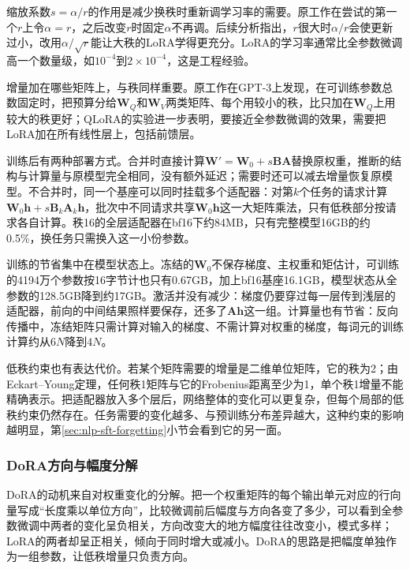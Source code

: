 缩放系数$s=\alpha/r$的作用是减少换秩时重新调学习率的需要。原工作在尝试的第一个$r$上令$\alpha=r$，之后改变$r$时固定$\alpha$不再调。后续分析指出，$r$很大时$\alpha/r$会使更新过小，改用$\alpha/\sqrt r$能让大秩的LoRA学得更充分。LoRA的学习率通常比全参数微调高一个数量级，如$10^{-4}$到$2\times10^{-4}$，这是工程经验。

增量加在哪些矩阵上，与秩同样重要。原工作在GPT-3上发现，在可训练参数总数固定时，把预算分给$\bm W_Q$和$\bm W_V$两类矩阵、每个用较小的秩，比只加在$\bm W_Q$上用较大的秩更好\cite{ket-hu2021lora}；QLoRA的实验进一步表明，要接近全参数微调的效果，需要把LoRA加在所有线性层上，包括前馈层。

训练后有两种部署方式。合并时直接计算$\bm W'=\bm W_0+s\bm B\bm A$替换原权重，推断的结构与计算量与原模型完全相同，没有额外延迟；需要时还可以减去增量恢复原模型。不合并时，同一个基座可以同时挂载多个适配器：对第$k$个任务的请求计算$\bm W_0\bm h+s\bm B_k\bm A_k\bm h$，批次中不同请求共享$\bm W_0\bm h$这一大矩阵乘法，只有低秩部分按请求各自计算。秩16的全层适配器在bf16下约84MB，只有完整模型16GB的约0.5\%，换任务只需换入这一小份参数。

训练的节省集中在模型状态上。冻结的$\bm W_0$不保存梯度、主权重和矩估计，可训练的4194万个参数按16字节计也只有0.67GB，加上bf16基座16.1GB，模型状态从全参数的128.5GB降到约17GB。激活并没有减少：梯度仍要穿过每一层传到浅层的适配器，前向的中间结果照样要保存，还多了$\bm A\bm h$这一组。计算量也有节省：反向传播中，冻结矩阵只需计算对输入的梯度、不需计算对权重的梯度，每词元的训练计算约从$6N$降到$4N$。

低秩约束也有表达代价。若某个矩阵需要的增量是二维单位矩阵，它的秩为2；由Eckart--Young定理，任何秩1矩阵与它的Frobenius距离至少为1，单个秩1增量不能精确表示。把适配器放入多个层后，网络整体的变化可以更复杂，但每个局部的低秩约束仍然存在。任务需要的变化越多、与预训练分布差异越大，这种约束的影响越明显，第\ref{sec:nlp-sft-forgetting}小节会看到它的另一面。

\subsubsection{DoRA方向与幅度分解}
\label{sec:nlp-sft-dora}

DoRA的动机来自对权重变化的分解。把一个权重矩阵的每个输出单元对应的行向量写成“长度乘以单位方向”，比较微调前后幅度与方向各变了多少，可以看到全参数微调中两者的变化呈负相关，方向改变大的地方幅度往往改变小，模式多样；LoRA的两者却呈正相关，倾向于同时增大或减小。DoRA的思路是把幅度单独作为一组参数，让低秩增量只负责方向。

